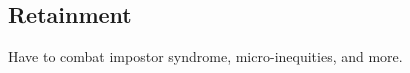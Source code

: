 \documentclass[acmtocl]{acmtrans2m}
\newcommand{\comment}[1]{}
\begin{document}
\subsection*{\textbf{Retainment}}
\vspace{-0.1in}
Have to combat impostor syndrome, micro-inequities, and more.








\end{document}
